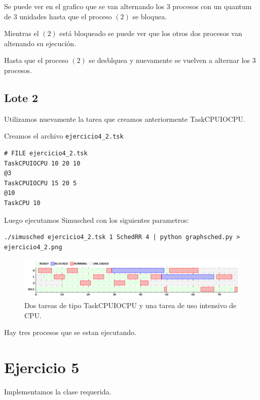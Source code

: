 Se puede ver en el grafico que se van alternando los 3 procesos con un quantum de 3 unidades hasta que el proceso $(2)$ se bloquea.

Mientras el $(2)$ está bloqueado se puede ver que los otros dos procesos van altenando su ejecución. 

Hasta que el proceso $(2)$ se desblquea y nuevamente se vuelven a alternar los 3 procesos.

\subsection{Lote 2}

Utilizamos nuevamente la tarea que creamos anteriormente TaskCPUIOCPU.

Creamos el archivo \verb|ejercicio4_2.tsk|

\begin{framed}
\begin{verbatim}
# FILE ejercicio4_2.tsk
TaskCPUIOCPU 10 20 10
@3
TaskCPUIOCPU 15 20 5
@10
TaskCPU 10
\end{verbatim}
\end{framed}

Luego ejecutamos Simusched con los siguientes parametros:

\begin{framed}
\begin{verbatim}
./simusched ejercicio4_2.tsk 1 SchedRR 4 | python graphsched.py > ejercicio4_2.png
\end{verbatim}
\end{framed}

\begin{figure}[h!]
  \caption{Dos tareas de tipo TaskCPUIOCPU y una tarea de uso intensivo de CPU.}
  \centering
    \includegraphics[width=1\textwidth]{img/ejercicio4_2.png}
\end{figure}

Hay tres procesos que se estan ejecutando.

\section{Ejercicio 5}

Implementamos la clase requerida.
